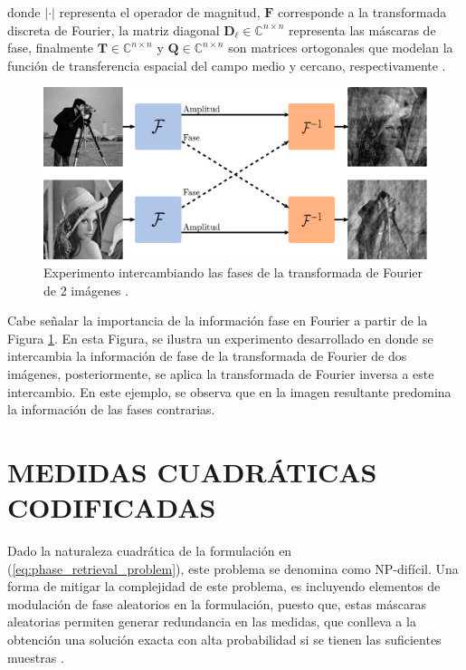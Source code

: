 donde $\vert \cdot \vert$ representa el operador de magnitud, $\mathbf{F}$ corresponde a la transformada discreta de Fourier, la matriz diagonal $\mathbf{D}_\ell \in \mathbb{C}^{n \times n}$ representa las máscaras de fase, finalmente $\mathbf{T} \in \mathbb{C}^{n \times n}$ y $\mathbf{Q} \in \mathbb{C}^{n \times n}$ son matrices ortogonales que modelan la función de transferencia espacial del campo medio y cercano, respectivamente .

\begin{figure}[H]
    \centering
    \includegraphics[width=0.8\linewidth]{images/mescla_abs_fase.pdf}
    \caption{\hspace{2mm}Experimento  intercambiando las fases de la transformada de Fourier de 2 imágenes .}
    \label{fig:mescla_fases}
\end{figure}

Cabe señalar la importancia de la información fase en Fourier a partir de la Figura \ref{fig:mescla_fases}. En esta Figura, se ilustra un experimento desarrollado en  donde se intercambia la información de fase de la transformada de Fourier de dos imágenes, posteriormente, se aplica la transformada de Fourier inversa a este intercambio. En este ejemplo, se observa que en la imagen resultante predomina la información de las fases contrarias.

\section{MEDIDAS CUADRÁTICAS CODIFICADAS}
Dado la naturaleza cuadrática de la formulación en (\ref{eq:phase_retrieval_problem}), este problema se denomina como NP-difícil. Una forma de mitigar la complejidad de este problema, es incluyendo elementos de modulación de fase aleatorios en la formulación, puesto que, estas máscaras aleatorias permiten generar redundancia en las medidas, que conlleva a la obtención una solución exacta con alta probabilidad si se tienen las suficientes muestras .

